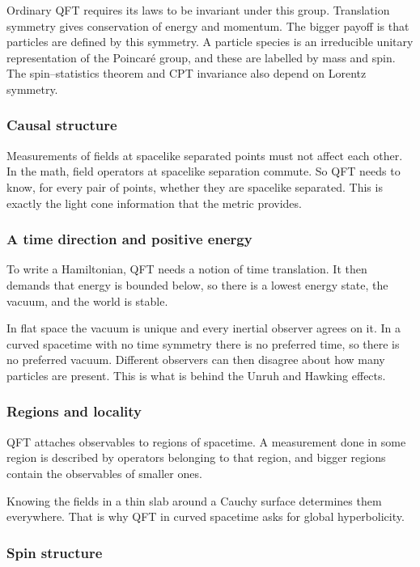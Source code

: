 Ordinary QFT requires its laws to be invariant under this group.
Translation symmetry gives conservation of energy and momentum.
The bigger payoff is that particles are defined by this symmetry.
A particle species is an irreducible unitary representation of the Poincar\'e group, and these are labelled by mass and spin.
The spin--statistics theorem and CPT invariance also depend on Lorentz symmetry.

\subsubsection{Causal structure}

Measurements of fields at spacelike separated points must not affect each other.
In the math, field operators at spacelike separation commute.
So QFT needs to know, for every pair of points, whether they are spacelike separated.
This is exactly the light cone information that the metric provides.

\subsubsection{A time direction and positive energy}

To write a Hamiltonian, QFT needs a notion of time translation.
It then demands that energy is bounded below, so there is a lowest energy state, the vacuum, and the world is stable.

In flat space the vacuum is unique and every inertial observer agrees on it.
In a curved spacetime with no time symmetry there is no preferred time, so there is no preferred vacuum.
Different observers can then disagree about how many particles are present.
This is what is behind the Unruh and Hawking effects.

\subsubsection{Regions and locality}

QFT attaches observables to regions of spacetime.
A measurement done in some region is described by operators belonging to that region, and bigger regions contain the observables of smaller ones.

Knowing the fields in a thin slab around a Cauchy surface determines them everywhere.
That is why QFT in curved spacetime asks for global hyperbolicity.

\subsubsection{Spin structure}


